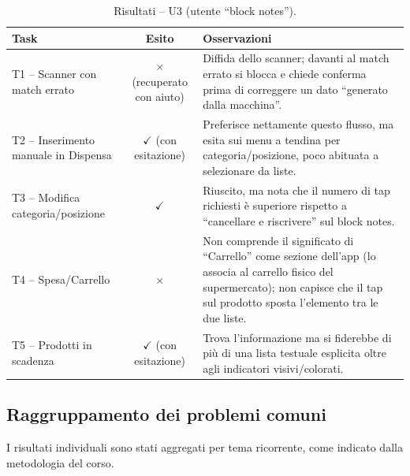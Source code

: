 \documentclass[11pt,a4paper]{article}
\begin{document}
\begin{table}[H]
\centering
\small
\renewcommand{\arraystretch}{1.3}
\begin{tabularx}{\textwidth}{>{\raggedright\arraybackslash}p{3.2cm} c >{\raggedright\arraybackslash}X}
\toprule
\textbf{Task} & \textbf{Esito} & \textbf{Osservazioni} \\
\midrule
T1 -- Scanner con match errato & {\color{redCons}$\times$} (recuperato con aiuto) & Diffida dello scanner; davanti al match errato si blocca e chiede conferma prima di correggere un dato ``generato dalla macchina''. \\ \addlinespace[0.4em]
T2 -- Inserimento manuale in Dispensa & {\color{greenPro}$\checkmark$} (con esitazione) & Preferisce nettamente questo flusso, ma esita sui menu a tendina per categoria/posizione, poco abituata a selezionare da liste. \\ \addlinespace[0.4em]
T3 -- Modifica categoria/posizione & {\color{greenPro}$\checkmark$} & Riuscito, ma nota che il numero di tap richiesti è superiore rispetto a ``cancellare e riscrivere'' sul block notes. \\ \addlinespace[0.4em]
T4 -- Spesa/Carrello & {\color{redCons}$\times$} & Non comprende il significato di ``Carrello'' come sezione dell'app (lo associa al carrello fisico del supermercato); non capisce che il tap sul prodotto sposta l'elemento tra le due liste. \\ \addlinespace[0.4em]
T5 -- Prodotti in scadenza & {\color{greenPro}$\checkmark$} (con esitazione) & Trova l'informazione ma si fiderebbe di più di una lista testuale esplicita oltre agli indicatori visivi/colorati. \\
\bottomrule
\end{tabularx}
\caption{Risultati -- U3 (utente ``block notes'').}
\label{tab:eval_u3}
\end{table}

\subsection{Raggruppamento dei problemi comuni}
I risultati individuali sono stati aggregati per tema ricorrente, come indicato dalla metodologia del corso.
\end{document}
